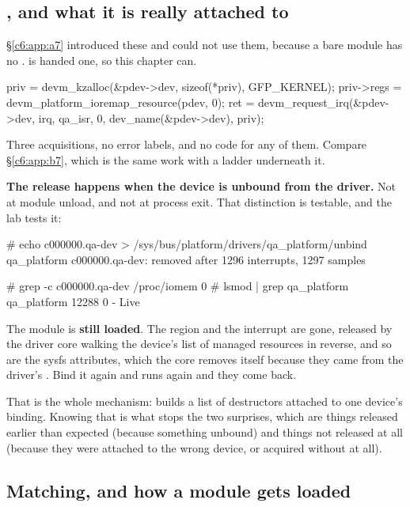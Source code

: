 \subsection{, and what it is really attached to}
\label{c10:app:a4}

\S\ref{c6:app:a7} introduced these and could not use them, because a bare module has no .  is handed one, so this chapter can.

\begin{ccode}
priv       = devm_kzalloc(&pdev->dev, sizeof(*priv), GFP_KERNEL);
priv->regs = devm_platform_ioremap_resource(pdev, 0);
ret        = devm_request_irq(&pdev->dev, irq, qa_isr, 0, dev_name(&pdev->dev), priv);
\end{ccode}

\noindent Three acquisitions, no error labels, and no  code for any of them. Compare
\S\ref{c6:app:b7}, which is the same work with a  ladder underneath it.

\textbf{The release happens when the device is unbound from the driver.} Not at module unload, and
not at process exit. That distinction is testable, and the lab tests it:

\begin{console}
# echo c000000.qa-dev > /sys/bus/platform/drivers/qa_platform/unbind
qa_platform c000000.qa-dev: removed after 1296 interrupts, 1297 samples

# grep -c c000000.qa-dev /proc/iomem
0
# lsmod | grep qa_platform
qa_platform 12288 0 - Live
\end{console}

\noindent The module is \textbf{still loaded}. The region and the interrupt are gone, released by
the driver core walking the device's list of managed resources in reverse, and so are the sysfs
attributes, which the core removes itself because they came from the driver's .
Bind it again and  runs again and they come back.

That is the whole mechanism:  builds a list of destructors attached to one device's
binding. Knowing that is what stops the two surprises, which are things released earlier than
expected (because something unbound) and things not released at all (because they were attached to
the wrong device, or acquired without  at all).

\subsection{Matching, and how a module gets loaded}
\label{c10:app:a5}

